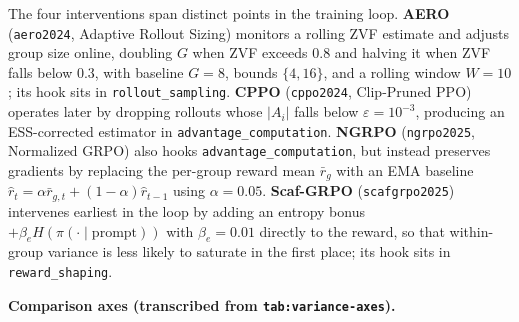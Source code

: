 \documentclass[
  american,
  11pt,
  a4paper,
  oneside]{report}
\begin{document}
The four interventions span distinct points in the training loop.
\textbf{AERO} (\texttt{aero2024}, Adaptive Rollout Sizing) monitors a
rolling ZVF estimate and adjusts group size online, doubling \(G\) when
ZVF exceeds 0.8 and halving it when ZVF falls below 0.3, with baseline
\(G{=}8\), bounds \(\{4,16\}\), and a rolling window \(W{=}10\); its
hook sits in \texttt{rollout\_sampling}. \textbf{CPPO}
(\texttt{cppo2024}, Clip-Pruned PPO) operates later by dropping rollouts
whose \(|A_i|\) falls below \(\varepsilon = 10^{-3}\), producing an
ESS-corrected estimator in \texttt{advantage\_computation}.
\textbf{NGRPO} (\texttt{ngrpo2025}, Normalized GRPO) also hooks
\texttt{advantage\_computation}, but instead preserves gradients by
replacing the per-group reward mean \(\bar r_g\) with an EMA baseline
\(\hat r_t = \alpha \bar r_{g,t} + (1-\alpha)\hat r_{t-1}\) using
\(\alpha{=}0.05\). \textbf{Scaf-GRPO} (\texttt{scafgrpo2025}) intervenes
earliest in the loop by adding an entropy bonus
\(+\beta_e H(\pi(\cdot\mid \text{prompt}))\) with \(\beta_e{=}0.01\)
directly to the reward, so that within-group variance is less likely to
saturate in the first place; its hook sits in \texttt{reward\_shaping}.

\textbf{Comparison axes (transcribed from \texttt{tab:variance-axes}).}
\end{document}
